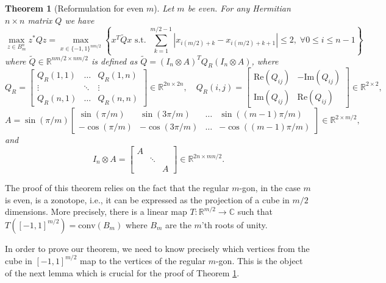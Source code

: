 \documentclass{article}
\newcommand{\RR}{\mathbb{R}}
\newcommand{\CC}{\mathbb{C}}
\newtheorem{theorem}{Theorem}
\theoremstyle{definition}
\newcommand{\conv}{\text{conv}}
\begin{document}
\begin{theorem}[Reformulation for even $m$]
\label{thm:zonotope-reformulation}
Let $m$ be even. For any Hermitian $n\times n$ matrix $Q$ we have
\begin{equation}\label{eq:zonotope-reformulation}
\max_{z \in B_m^n} z^* Q z = \max_{x \in \{-1,1\}^{nm/2}} \left\{ x^T \tilde{Q} x \text{ s.t. } \sum_{k=1}^{m/2-1} |x_{i(m/2)+k} - x_{i(m/2)+k+1}| \leq 2 ,\; \forall 0\leq i \leq n-1\right\}
\end{equation}
where $\tilde{Q} \in \RR^{nm/2 \times nm/2}$ is defined as $\tilde Q=(I_n\otimes A)^TQ_R(I_n\otimes A)$, where
\[
Q_R=\begin{bmatrix}
        Q_R(1,1) & \ldots & Q_R(1,n)\\
        \vdots & \ddots & \vdots\\
        Q_R(n,1) & \ldots & Q_R(n,n)
    \end{bmatrix}  \in \RR^{2n \times 2n} ,\quad  Q_R(i,j)=\begin{bmatrix}
        \text{Re}(Q_{ij}) & -\text{Im}(Q_{ij})\\
        \text{Im}(Q_{ij}) & \text{Re}(Q_{ij})
    \end{bmatrix} \in \RR^{2\times 2},
    \]
    \[
    A=\sin(\pi/m)\begin{bmatrix}
        \sin(\pi/m) & \sin(3\pi/m) & \ldots & \sin((m-1)\pi/m)\\
        -\cos(\pi/m) & -\cos(3\pi/m) & \ldots & -\cos((m-1)\pi/m)
    \end{bmatrix} \in \RR^{2\times m/2},
    \]
and
\[ I_n\otimes A=\begin{bmatrix}
        A & &\\& \ddots &\\& & A
    \end{bmatrix} \in \RR^{2n\times mn/2}. \]
\end{theorem}

The proof of this theorem relies on the fact that the regular $m$-gon, in the case $m$ is even, is a zonotope, i.e., it can be expressed as the projection of a cube in $m/2$ dimensions. More precisely, there is a linear map $T:\RR^{m/2}\to \CC$ such that $T([-1,1]^{m/2}) = \conv(B_m)$ where $B_m$ are the $m$'th roots of unity.

In order to prove our theorem, we need to know precisely which vertices from the cube in $[-1,1]^{m/2}$ map to the vertices of the regular $m$-gon. This is the object of the next lemma which is crucial for the proof of Theorem \ref{thm:zonotope-reformulation}.
\end{document}
